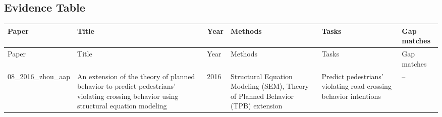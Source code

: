 \documentclass{article}
\begin{document}
\subsection{Evidence Table}
\begin{longtable}{p{}p{}p{}p{}p{}p{}}
\toprule
Paper & Title & Year & Methods & Tasks & Gap matches \\
\midrule
\endfirsthead
\toprule
Paper & Title & Year & Methods & Tasks & Gap matches \\
\midrule
\endhead
08\_2016\_zhou\_aap & An extension of the theory of planned behavior to predict pedestrians' violating crossing behavior using structural equation modeling & 2016 & Structural Equation Modeling (SEM), Theory of Planned Behavior (TPB) extension & Predict pedestrians' violating road-crossing behavior intentions & -- \\
\bottomrule
\end{longtable}
\end{document}
